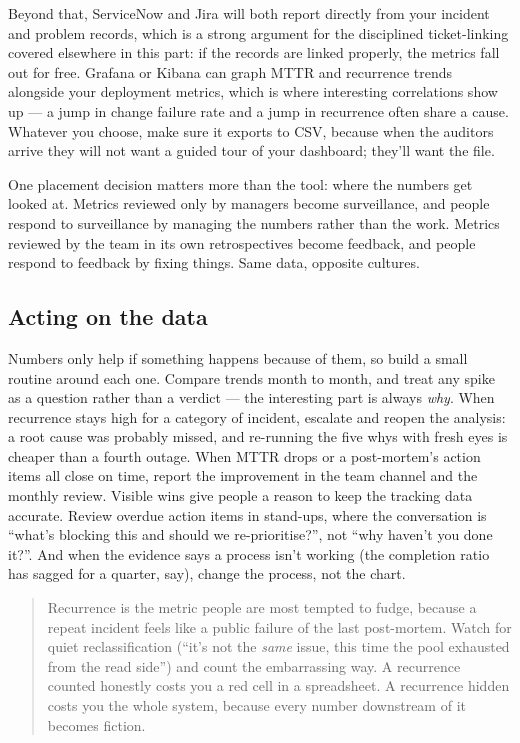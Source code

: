 Beyond that, ServiceNow and Jira will both report directly from your incident and problem records, which is a strong argument for the disciplined ticket-linking covered elsewhere in this part: if the records are linked properly, the metrics fall out for free. Grafana or Kibana can graph MTTR and recurrence trends alongside your deployment metrics, which is where interesting correlations show up — a jump in change failure rate and a jump in recurrence often share a cause. Whatever you choose, make sure it exports to CSV, because when the auditors arrive they will not want a guided tour of your dashboard; they'll want the file.


One placement decision matters more than the tool: where the numbers get looked at. Metrics reviewed only by managers become surveillance, and people respond to surveillance by managing the numbers rather than the work. Metrics reviewed by the team in its own retrospectives become feedback, and people respond to feedback by fixing things. Same data, opposite cultures.



\subsection{Acting on the data}


Numbers only help if something happens because of them, so build a small routine around each one. Compare trends month to month, and treat any spike as a question rather than a verdict — the interesting part is always \emph{why}. When recurrence stays high for a category of incident, escalate and reopen the analysis: a root cause was probably missed, and re-running the five whys with fresh eyes is cheaper than a fourth outage. When MTTR drops or a post-mortem's action items all close on time, report the improvement in the team channel and the monthly review. Visible wins give people a reason to keep the tracking data accurate. Review overdue action items in stand-ups, where the conversation is ``what's blocking this and should we re-prioritise?'', not ``why haven't you done it?''. And when the evidence says a process isn't working (the completion ratio has sagged for a quarter, say), change the process, not the chart.



\begin{quote}\small
Recurrence is the metric people are most tempted to fudge, because a repeat incident feels like a public failure of the last post-mortem. Watch for quiet reclassification (``it's not the \emph{same} issue, this time the pool exhausted from the read side'') and count the embarrassing way. A recurrence counted honestly costs you a red cell in a spreadsheet. A recurrence hidden costs you the whole system, because every number downstream of it becomes fiction.
\end{quote}


